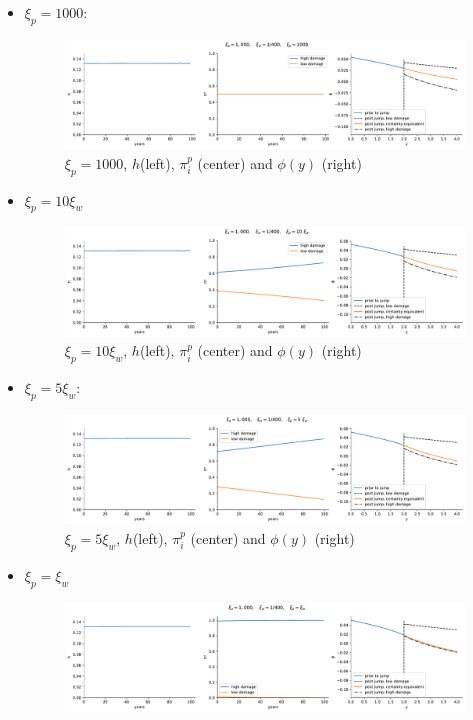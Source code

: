 \documentclass{article}
\begin{document}
\doublespacing
\begin{itemize}
    \item$\xi_p= 1000$:
        \begin{figure}[H]
            \centering
            \includegraphics[width=\linewidth]{notebook/phi_n.pdf}
            \caption{$\xi_p=1000$,  $h$(left), $\pi_i^p$ (center) and $\phi(y)$ (right)}
            \label{fig:notebook/phi_n}
        \end{figure}
\item $\xi_p=10\xi_w$
    \begin{figure}[H]
        \centering
        \includegraphics[width=\linewidth]{notebook/phi_x10.pdf}
        \caption{$\xi_p= 10\xi_w$, $h$(left), $\pi_i^p$ (center) and $\phi(y)$ (right)}
        \label{fig:notebook/phi_x10}
    \end{figure}
\item$\xi_p= 5\xi_w$:
       \begin{figure}[H]
           \centering
           \includegraphics[width=\linewidth]{notebook/phi_x5.pdf}
           \caption{$\xi_p= 5\xi_w$, $h$(left), $\pi_i^p$ (center) and $\phi(y)$ (right)}
           \label{fig:notebook/phi_x5}
       \end{figure}
       \newpage
    \item$\xi_p=\xi_w$
\begin{figure}[H]
    \centering
    \includegraphics[width=\linewidth]{notebook/phi_x1.pdf}

\end{figure}
\end{itemize}
\end{document}
